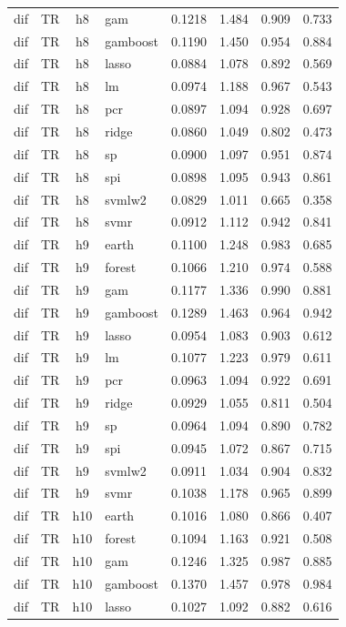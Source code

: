 \begin{ThreePartTable}
\begin{longtable}[t]{llclcccc}
dif & TR & h8 & gam & 0.1218 & 1.484 & 0.909 & 0.733\\
dif & TR & h8 & gamboost & 0.1190 & 1.450 & 0.954 & 0.884\\
dif & TR & h8 & lasso & 0.0884 & 1.078 & 0.892 & 0.569\\
dif & TR & h8 & lm & 0.0974 & 1.188 & 0.967 & 0.543\\
dif & TR & h8 & pcr & 0.0897 & 1.094 & 0.928 & 0.697\\
dif & TR & h8 & ridge & 0.0860 & 1.049 & 0.802 & 0.473\\
dif & TR & h8 & sp & 0.0900 & 1.097 & 0.951 & 0.874\\
dif & TR & h8 & spi & 0.0898 & 1.095 & 0.943 & 0.861\\
dif & TR & h8 & svmlw2 & 0.0829 & 1.011 & 0.665 & 0.358\\
dif & TR & h8 & svmr & 0.0912 & 1.112 & 0.942 & 0.841\\
\addlinespace
dif & TR & h9 & earth & 0.1100 & 1.248 & 0.983 & 0.685\\
dif & TR & h9 & forest & 0.1066 & 1.210 & 0.974 & 0.588\\
dif & TR & h9 & gam & 0.1177 & 1.336 & 0.990 & 0.881\\
dif & TR & h9 & gamboost & 0.1289 & 1.463 & 0.964 & 0.942\\
dif & TR & h9 & lasso & 0.0954 & 1.083 & 0.903 & 0.612\\
dif & TR & h9 & lm & 0.1077 & 1.223 & 0.979 & 0.611\\
dif & TR & h9 & pcr & 0.0963 & 1.094 & 0.922 & 0.691\\
dif & TR & h9 & ridge & 0.0929 & 1.055 & 0.811 & 0.504\\
dif & TR & h9 & sp & 0.0964 & 1.094 & 0.890 & 0.782\\
dif & TR & h9 & spi & 0.0945 & 1.072 & 0.867 & 0.715\\
dif & TR & h9 & svmlw2 & 0.0911 & 1.034 & 0.904 & 0.832\\
dif & TR & h9 & svmr & 0.1038 & 1.178 & 0.965 & 0.899\\
\addlinespace
dif & TR & h10 & earth & 0.1016 & 1.080 & 0.866 & 0.407\\
dif & TR & h10 & forest & 0.1094 & 1.163 & 0.921 & 0.508\\
dif & TR & h10 & gam & 0.1246 & 1.325 & 0.987 & 0.885\\
dif & TR & h10 & gamboost & 0.1370 & 1.457 & 0.978 & 0.984\\
dif & TR & h10 & lasso & 0.1027 & 1.092 & 0.882 & 0.616\\

\end{longtable}
\end{ThreePartTable}
